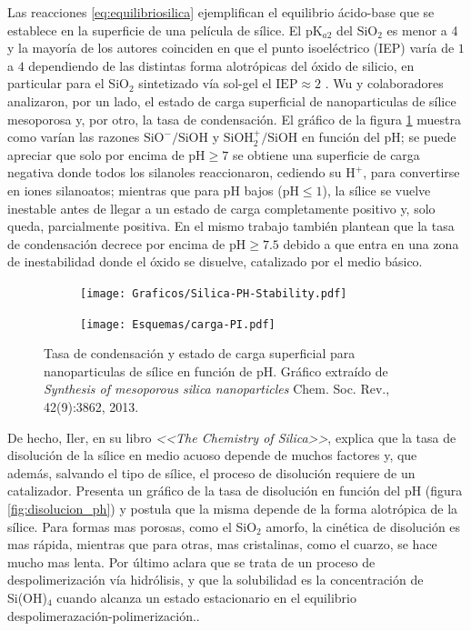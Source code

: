 	Las reacciones \ref{eq:equilibriosilica} ejemplifican el equilibrio ácido-base que se establece en la superficie de una película de sílice. El pK$_{a2}$ del $\text{SiO}_2$ es menor a 4 y la mayoría de los autores coinciden en que el punto isoeléctrico (IEP) varía de $1$ a $4$ dependiendo de  las distintas forma alotrópicas del óxido de silicio, en particular para el SiO$_2$ sintetizado vía sol-gel el $\text{IEP}\approx 2$ \cite{Kosmulski2002,Kosmulski2014,Schwarz1984,Si-HanWu2013}.
	Wu y colaboradores\cite{Si-HanWu2013} analizaron, por un lado, el estado de carga superficial de nanoparticulas de sílice mesoporosa y, por otro, la tasa de condensación. El gráfico de la figura \ref{fig:silica_ph} muestra como varían las razones  $\text{SiO}^{-}/\text{SiOH}$ y $\text{SiOH}_2^{+}/\text{SiOH}$ en función del pH; se puede apreciar que solo por encima de $\text{pH}\geq7$ se obtiene una superficie de carga negativa donde todos los silanoles reaccionaron, cediendo su $\text{H}^{+}$, para convertirse en iones silanoatos; mientras que para pH bajos ($\text{pH}\leq1$), la sílice se vuelve inestable antes de llegar a un estado de carga completamente positivo y, solo queda, parcialmente positiva. En el mismo trabajo\cite{Si-HanWu2013} también plantean que la tasa de condensación decrece por encima de $\text{pH}\geq7.5$ debido a que entra en una zona de inestabilidad donde el óxido se disuelve, catalizado por el medio básico.
		\begin{figure}[th!]
			\begin{subfigure}[t]{0.73\textwidth}
 	       	\texttt{[image: Graficos/Silica-PH-Stability.pdf]}
 	       	\end{subfigure}
 	       	\begin{subfigure}[t]{0.25\textwidth}
 	       	 	\texttt{[image: Esquemas/carga-PI.pdf]}
	      	 \end{subfigure}
	    	\caption[Tasa de condensación y estado de carga superficial]{Tasa de condensación y estado de carga superficial para nanoparticulas de sílice en función de pH. Gráfico extraído de \textit{Synthesis of mesoporous silica nanoparticles} Chem. Soc. Rev., 42(9):3862, 2013.\cite{Si-HanWu2013}}
	       	\label{fig:silica_ph}
	    	\end{figure}
	De hecho, Iler, en su libro \textit{<<The Chemistry of Silica>>}, explica que la tasa de disolución de la sílice en medio acuoso depende de muchos factores y, que además, salvando el tipo de sílice, el proceso de disolución requiere de un catalizador. Presenta un gráfico de la tasa de disolución en función del pH (figura \ref{fig:disolucion_ph}) y postula que la misma depende de la forma alotrópica de la sílice. Para formas mas porosas, como el SiO$_2$ amorfo, la cinética de disolución es mas rápida, mientras que para otras, mas cristalinas, como el cuarzo, se hace mucho mas lenta. Por último aclara que se trata de un proceso de despolimerización vía hidrólisis, y que la solubilidad es la concentración de Si(OH)$_4$ cuando alcanza un estado estacionario en el equilibrio despolimerazación-polimerización.\cite{iler1979}. 

